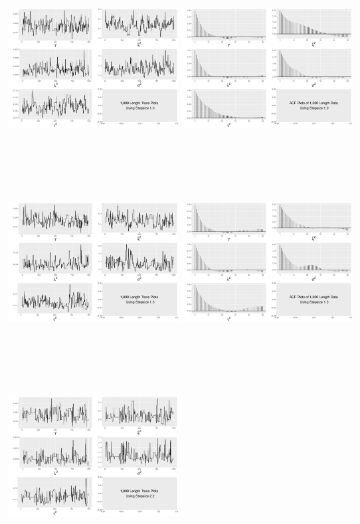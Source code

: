 \begin{figure}[h]
\centering
\includegraphics[width=0.4\textwidth,height=5cm]{Chapters/05MCMCOU/plots/gg1k1chain.pdf}
\includegraphics[width=0.4\textwidth,height=5cm]{Chapters/05MCMCOU/plots/gg1k1acf.pdf}
\includegraphics[width=0.4\textwidth,height=5cm]{Chapters/05MCMCOU/plots/gg1k13chain.pdf}
\includegraphics[width=0.4\textwidth,height=5cm]{Chapters/05MCMCOU/plots/gg1k13acf.pdf}
\includegraphics[width=0.4\textwidth,height=5cm]{Chapters/05MCMCOU/plots/gg1k22chain.pdf}

\end{figure}
